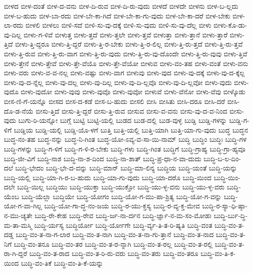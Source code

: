{ಬೀಳದ
ಬೀಳ-ದಂತೆ
ಬೀಳ-ದ-ವನು
ಬೀಳ-ದಿ-ರುವ
ಬೀಳ-ದಿ-ರು-ವುದು
ಬೀಳದೆ
ಬೀಳದೇ
ಬೀಳನು
ಬೀಳ-ಬ-ಲ್ಲದು
ಬೀಳ-ಬ-ಹುದು
ಬೀಳ-ಬಾ-ರದು
ಬೀಳ-ಬೇ-ಕಾ-ಗಿದೆ
ಬೀಳ-ಬೇ-ಕಾ-ಗು-ವುದು
ಬೀಳ-ಬೇ-ಕಾ-ದರೆ
ಬೀಳ-ಬೇಕು
ಬೀಳ-ಲಾ-ರದು
ಬೀಳಲಿ
ಬೀಳಲು
ಬೀಳಿ-ಸದೆ
ಬೀಳಿ-ಸು-ವು-ದಕ್ಕೆ
ಬೀಳಿ-ಸು-ವುದು
ಬೀಳಿ-ಸು-ವು-ದೆಲ್ಲ
ಬೀಳು
ಬೀಳು-ಕೊ-ಡು-ವು-ದಿಲ್ಲ
ಬೀಳು-ಗ-ಳಿವೆ
ಬೀಳುತ್ತ
ಬೀಳು-ತ್ತದೆ
ಬೀಳು-ತ್ತಲೇ
ಬೀಳು-ತ್ತವೆ
ಬೀಳುತ್ತಾ
ಬೀಳು-ತ್ತಾನೆ
ಬೀಳು-ತ್ತಾರೆ
ಬೀಳು-ತ್ತಿದೆ
ಬೀಳು-ತ್ತಿ-ದ್ದರೂ
ಬೀಳು-ತ್ತಿ-ದ್ದರೆ
ಬೀಳು-ತ್ತಿ-ರ-ಬೇಕು
ಬೀಳು-ತ್ತಿ-ರ-ಲಿಲ್ಲ
ಬೀಳು-ತ್ತಿ-ರು-ತ್ತದೆ
ಬೀಳು-ತ್ತಿ-ರು-ತ್ತವೆ
ಬೀಳು-ತ್ತಿ-ರುವ
ಬೀಳು-ತ್ತಿ-ರು-ವಾಗ
ಬೀಳು-ತ್ತಿ-ರು-ವುದು
ಬೀಳು-ತ್ತಿ-ರು-ವು-ದೊಂದೇ
ಬೀಳು-ತ್ತಿ-ರು-ವುವು
ಬೀಳು-ತ್ತಿವೆ
ಬೀಳು-ತ್ತೇನೆ
ಬೀಳು-ತ್ತೇವೆ
ಬೀಳು-ತ್ತೇ-ವೆಯೊ
ಬೀಳು-ತ್ತೇ-ವೆಯೋ
ಬೀಳುವ
ಬೀಳು-ವಂ-ತಹ
ಬೀಳು-ವಂತೆ
ಬೀಳು-ವನು
ಬೀಳು-ವರು
ಬೀಳು-ವ-ವ-ನಲ್ಲ
ಬೀಳು-ವಷ್ಟು
ಬೀಳು-ವಾಗ
ಬೀಳುವು
ಬೀಳು-ವುದ
ಬೀಳು-ವು-ದಕ್ಕೆ
ಬೀಳು-ವು-ದ-ಕ್ಕೆಲ್ಲ
ಬೀಳು-ವು-ದ-ನ್ನೆಲ್ಲ
ಬೀಳು-ವು-ದಲ್ಲ
ಬೀಳು-ವು-ದಿಲ್ಲ
ಬೀಳು-ವು-ದಿ-ಲ್ಲವೊ
ಬೀಳು-ವು-ದಿ-ಲ್ಲವೋ
ಬೀಳು-ವುದು
ಬೀಳು-ವುದೊ
ಬೀಳು-ವುದೋ
ಬೀಳು-ವುವು
ಬೀಳು-ವುವೊ
ಬೀಳು-ವುವೋ
ಬೀಳುವೆ
ಬೀಳು-ವೆನೋ
ಬೀಳು-ವೆವು
ಬೀಳ್ಕೊಡು
ಬೀಸ-ಣಿ-ಗೆ-ಯನ್ನೊ
ಬೀಸದ
ಬೀಸ-ದ-ಕಡೆ
ಬೀಸ-ಬ-ಹುದು
ಬೀಸಲಿ
ಬೀಸಿ
ಬೀಸಿತು
ಬೀಸಿ-ದರೂ
ಬೀಸಿ-ದರೆ
ಬೀಸಿ-ದೊ-ಡ-ನೆಯೆ
ಬೀಸು-ತ್ತಿದೆ
ಬೀಸು-ತ್ತಿ-ದ್ದರೆ
ಬೀಸು-ತ್ತಿ-ರುವ
ಬೀಸುವ
ಬೀಸು-ವ-ವನು
ಬೀಸು-ವು-ದ-ವ-ನಿಂದ
ಬೀಸು-ವುದು
ಬುಗು-ರಿ-ಯನ್ನೋ
ಬುಗ್ಗೆ
ಬುಟ್ಟಿ
ಬುಟ್ಟಿ-ಯಲ್ಲಿ
ಬುಡದ
ಬುಡ-ದಲ್ಲಿ
ಬುಡ-ವುಳ್ಳ
ಬುಡ್ಡಿ
ಬುಡ್ಡಿ-ಗಳನ್ನು
ಬುಡ್ಡಿ-ಗ-ಳಿಗೆ
ಬುಡ್ಡಿಯ
ಬುಡ್ಡಿ-ಯಲ್ಲಿ
ಬುಡ್ಡಿ-ಯೊ-ಳಗೆ
ಬುತ್ತಿ
ಬುತ್ತಿ-ಯಲ್ಲಿ
ಬುತ್ತಿ-ಯಾಗಿ
ಬುತ್ತಿ-ಯಾ-ಗು-ವುದು
ಬುದ್ಧ
ಬುದ್ಧನ
ಬುದ್ಧ-ನಂ-ತಹ
ಬುದ್ಧ-ನನ್ನು
ಬುದ್ಧ-ನಿ-ಗಿಂತ
ಬುದ್ಧ-ಯೋ-ಽವ್ಯ-ವ-ಸಾ-ಯಿ-ನಾಮ್
ಬುದ್ಧಿ
ಬುದ್ಧಿಂ
ಬುದ್ಧಿಃ
ಬುದ್ಧಿ-ಗಳ
ಬುದ್ಧಿ-ಗಳನ್ನು
ಬುದ್ಧಿ-ಗ-ಳಿಗೆ
ಬುದ್ಧಿ-ಗ-ಳಿ-ರ-ಬೇಕು
ಬುದ್ಧಿ-ಗಳು
ಬುದ್ಧಿ-ಗಿಂತ
ಬುದ್ಧಿಗೆ
ಬುದ್ಧಿ-ಗ್ರಾಹ್ಯ
ಬುದ್ಧಿ-ಗ್ರಾ-ಹ್ಯವೂ
ಬುದ್ಧಿ-ಜೀ-ವಿಗೆ
ಬುದ್ಧಿ-ನಾಶ
ಬುದ್ಧಿ-ನಾ-ಶ-ದಿಂದ
ಬುದ್ಧಿ-ನಾ-ಶಾತ್
ಬುದ್ಧಿ-ಪ್ರ-ಧಾ-ನ-ವಾ-ದುದು
ಬುದ್ಧಿ-ಬ-ಲ-ದಿಂ-ದಲೆ
ಬುದ್ಧಿ-ಭೇದಂ
ಬುದ್ಧಿ-ಭೇ-ದ-ವನ್ನು
ಬುದ್ಧಿ-ಮಾನ್
ಬುದ್ಧಿ-ಮಾ-ಲಿನ್ಯ
ಬುದ್ಧಿಯ
ಬುದ್ಧಿ-ಯಂತೆ
ಬುದ್ಧಿ-ಯನ್ನು
ಬುದ್ಧಿ-ಯಲ್ಲಿ
ಬುದ್ಧಿ-ಯಾ-ಗಿ-ರ-ಬ-ಹುದು
ಬುದ್ಧಿ-ಯಾ-ಗು-ವುದು
ಬುದ್ಧಿ-ಯಾ-ದರೊ
ಬುದ್ಧಿ-ಯಿಂದ
ಬುದ್ಧಿ-ಯಿಂ-ದಲೇ
ಬುದ್ಧಿ-ಯಿಲ್ಲ
ಬುದ್ಧಿಯು
ಬುದ್ಧಿ-ಯುಕ್ತಾ
ಬುದ್ಧಿ-ಯುಕ್ತೋ
ಬುದ್ಧಿ-ಯು-ಳ್ಳ-ವನು
ಬುದ್ಧಿ-ಯು-ಳ್ಳ-ವರು
ಬುದ್ಧಿ-ಯೆಂಬ
ಬುದ್ಧಿ-ಯೆಲ್ಲಾ
ಬುದ್ಧಿಯೇ
ಬುದ್ಧಿ-ಯೋಗಂ
ಬುದ್ಧಿ-ಯೋ-ಗ-ಮು-ಪಾ-ಶ್ರಿತ್ಯ
ಬುದ್ಧಿ-ಯೋ-ಗ-ವನ್ನು
ಬುದ್ಧಿ-ಯೋ-ಗ-ವಾ-ಗಿಲ್ಲ
ಬುದ್ಧಿ-ಯೋ-ಗಾ-ದ್ಧ-ನಂ-ಜಯ
ಬುದ್ಧಿ-ರ-ಯು-ಕ್ತಸ್ಯ
ಬುದ್ಧಿ-ರ-ವ್ಯ-ಕ್ತ-ಮೇವ
ಬುದ್ಧಿ-ರ-ಸ್ಯಾ-ಧಿ-ಷ್ಠಾ-ನ-ಮು-ಚ್ಯತೇ
ಬುದ್ಧಿ-ರೇ-ಕೇಹ
ಬುದ್ಧಿ-ರೇವ
ಬುದ್ಧಿ-ರ್ಜ-ನಾ-ರ್ದನ
ಬುದ್ಧಿ-ರ್ಜ್ಞಾ-ನ-ಮ-ಸಂ-ಮೋಹಃ
ಬುದ್ಧಿ-ರ್ಬು-ದ್ಧಿ-ಮ-ತಾ-ಮಸ್ಮಿ
ಬುದ್ಧಿ-ರ್ಯಸ್ಯ
ಬುದ್ಧಿರ್ಯೋ
ಬುದ್ಧಿ-ರ್ಯೋಗೇ
ಬುದ್ಧಿ-ರ್ವ್ಯ-ತಿ-ತ-ರಿ-ಷ್ಯತಿ
ಬುದ್ಧಿ-ವಂತ
ಬುದ್ಧಿ-ವಂ-ತ-ದಡ್ಡ
ಬುದ್ಧಿ-ವಂ-ತ-ನಾ-ಗ-ಲಾರ
ಬುದ್ಧಿ-ವಂ-ತ-ನಾಗಿ
ಬುದ್ಧಿ-ವಂ-ತ-ನಾ-ಗು-ತ್ತಾನೆ
ಬುದ್ಧಿ-ವಂ-ತ-ನಾದ
ಬುದ್ಧಿ-ವಂ-ತ-ನಿಗೆ
ಬುದ್ಧಿ-ವಂ-ತನೂ
ಬುದ್ಧಿ-ವಂ-ತರ
ಬುದ್ಧಿ-ವಂ-ತ-ರ-ನ್ನಾಗಿ
ಬುದ್ಧಿ-ವಂ-ತ-ರಲ್ಲ
ಬುದ್ಧಿ-ವಂ-ತ-ರಲ್ಲಿ
ಬುದ್ಧಿ-ವಂ-ತ-ರಾ-ಗಿ-ದ್ದರೆ
ಬುದ್ಧಿ-ವಂ-ತ-ರಾದ
ಬುದ್ಧಿ-ವಂ-ತ-ರಿ-ರು-ವರು
ಬುದ್ಧಿ-ವಂ-ತರು
ಬುದ್ಧಿ-ವಂ-ತರೂ
ಬುದ್ಧಿ-ವಂ-ತಿ-ಕ-ಯಿಂದ
ಬುದ್ಧಿ-ವಂ-ತಿಕೆ
ಬುದ್ಧಿ-ವಂ-ತಿ-ಕೆ-ಯನ್ನು
}
